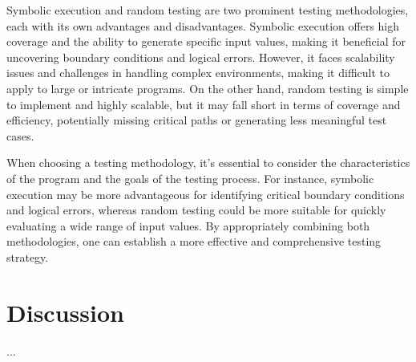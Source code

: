 \documentclass[11pt]{article}
\begin{document}
Symbolic execution and random testing are two prominent testing methodologies, each with its own advantages and disadvantages. Symbolic execution offers high coverage and the ability to generate specific input values, making it beneficial for uncovering boundary conditions and logical errors. However, it faces scalability issues and challenges in handling complex environments, making it difficult to apply to large or intricate programs. On the other hand, random testing is simple to implement and highly scalable, but it may fall short in terms of coverage and efficiency, potentially missing critical paths or generating less meaningful test cases.

When choosing a testing methodology, it's essential to consider the characteristics of the program and the goals of the testing process. For instance, symbolic execution may be more advantageous for identifying critical boundary conditions and logical errors, whereas random testing could be more suitable for quickly evaluating a wide range of input values. By appropriately combining both methodologies, one can establish a more effective and comprehensive testing strategy.


\section{Discussion}
...\\
\end{document}
